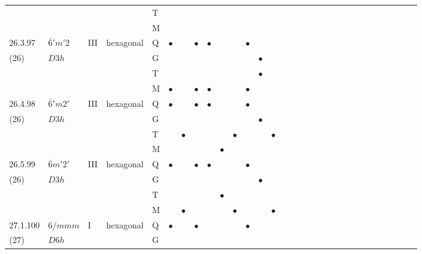 \documentclass[fleqn,9pt,landscape]{jsarticle}
\begin{document}
\begin{longtable}{lllll|l|l|l|l|l|l|l|l|l|ll|ll|ll|ll|ll|ll|ll|ll}
 &  &  &  & T &  &  &  &  &  &  &  &  &  &  &  &  &  &  &  &  &  &  &  &  &  &  &  &  &  \\
 &  &  &  & M &  &  &  &  &  &  &  &  &  &  &  &  &  &  &  &  &  &  &  &  &  &  &  &  &  \\ \hline
26.3.97 & \texttt{$\bar{6}'m'2$} & III & hexagonal & Q & $\bullet$ &  & $\bullet$ & $\bullet$ &  &  & $\bullet$ &  &  &  &  &  &  &  &  &  &  &  &  &  &  &  &  &  &  \\
(26) & $D3h$ &  &  & G &  &  &  &  &  &  &  & $\bullet$ &  &  &  &  &  &  &  &  &  &  &  &  &  &  &  &  &  \\
 &  &  &  & T &  &  &  &  &  &  &  & $\bullet$ &  &  &  &  &  &  &  &  &  &  &  &  &  &  &  &  &  \\
 &  &  &  & M & $\bullet$ &  & $\bullet$ & $\bullet$ &  &  & $\bullet$ &  &  &  &  &  &  &  &  &  &  &  &  &  &  &  &  &  &  \\ \hline
26.4.98 & \texttt{$\bar{6}'m2'$} & III & hexagonal & Q & $\bullet$ &  & $\bullet$ & $\bullet$ &  &  & $\bullet$ &  &  &  &  &  &  &  &  &  &  &  &  &  &  &  &  &  &  \\
(26) & $D3h$ &  &  & G &  &  &  &  &  &  &  & $\bullet$ &  &  &  &  &  &  &  &  &  &  &  &  &  &  &  &  &  \\
 &  &  &  & T &  & $\bullet$ &  &  &  & $\bullet$ &  &  & $\bullet$ &  &  &  &  &  &  &  &  &  &  &  &  &  &  &  &  \\
 &  &  &  & M &  &  &  &  & $\bullet$ &  &  &  &  &  &  &  &  &  &  &  &  &  &  &  &  &  &  &  &  \\ \hline
26.5.99 & \texttt{$\bar{6}m'2'$} & III & hexagonal & Q & $\bullet$ &  & $\bullet$ & $\bullet$ &  &  & $\bullet$ &  &  &  &  &  &  &  &  &  &  &  &  &  &  &  &  &  &  \\
(26) & $D3h$ &  &  & G &  &  &  &  &  &  &  & $\bullet$ &  &  &  &  &  &  &  &  &  &  &  &  &  &  &  &  &  \\
 &  &  &  & T &  &  &  &  & $\bullet$ &  &  &  &  &  &  &  &  &  &  &  &  &  &  &  &  &  &  &  &  \\
 &  &  &  & M &  & $\bullet$ &  &  &  & $\bullet$ &  &  & $\bullet$ &  &  &  &  &  &  &  &  &  &  &  &  &  &  &  &  \\ \hline
27.1.100 & \texttt{$6/mmm$} & I & hexagonal & Q & $\bullet$ &  & $\bullet$ &  &  &  & $\bullet$ &  &  &  &  &  &  &  &  &  &  &  &  &  &  &  &  &  &  \\
(27) & $D6h$ &  &  & G &  &  &  &  &  &  &  &  &  &  &  &  &  &  &  &  &  &  &  &  &  &  &  &  &  \\

\end{longtable}
\end{document}
